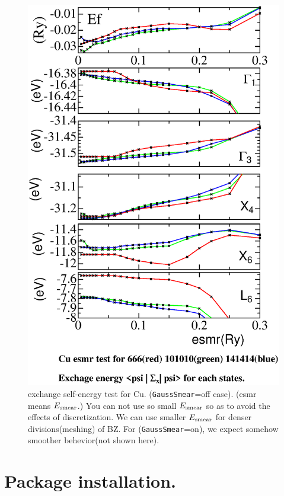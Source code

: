 \documentclass[a4paper,10pt,epsf,fleqn]{article}
\begin{document}
\begin{figure}
\includegraphics[width=15cm]{extest_cu.eps}
\caption[]{exchange self-energy test for Cu. ({\tt GaussSmear}=off case).
(esmr means $E_{\rm smear}$.) You can not use so small $E_{\rm smear}$ so as
to avoid the effects of discretization. We can use smaller $E_{\rm smear}$
for denser divisions(meshing) of BZ.
For ({\tt GaussSmear}=on), we expect somehow smoother behevior(not shown here). }
\label{extestcu}
\end{figure}


\newpage
\section{Package installation.}
\end{document}
